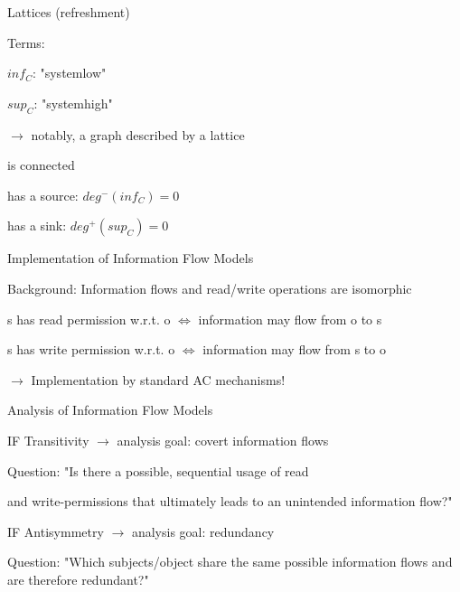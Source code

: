 \documentclass[a4paper]{article}
\begin{document}
\begin{multicols}{3}
    Lattices (refreshment)
    \begin{itemize*}
        \item Terms:
        \begin{itemize*}
            \item $inf_C$: "systemlow"
            \item $sup_C$: "systemhigh"
        \end{itemize*}
        \item $\rightarrow$ notably, a graph described by a lattice
        \item is connected
        \item has a source: $deg^-(inf_C)= 0$
        \item has a sink: $deg^+(sup_C)= 0$
    \end{itemize*}

    Implementation of Information Flow Models
    \begin{itemize*}
        \item Background: Information flows and read/write operations are isomorphic
        \begin{itemize*}
            \item s has read permission w.r.t. o $\Leftrightarrow$ information may flow from o to s
            \item s has write permission w.r.t. o $\Leftrightarrow$ information may flow from s to o
        \end{itemize*}
        \item $\rightarrow$ Implementation by standard AC mechanisms!
    \end{itemize*}

    Analysis of Information Flow Models
    \begin{itemize*}
        \item IF Transitivity $\rightarrow$ analysis goal: covert information flows
        \begin{itemize*}
            \item Question: "Is there a possible, sequential usage of read\item and write-permissions that ultimately leads to an unintended information flow?"
        \end{itemize*}
        \item IF Antisymmetry $\rightarrow$ analysis goal: redundancy
        \begin{itemize*}
            \item Question: "Which subjects/object share the same possible information flows and are therefore redundant?"
        \end{itemize*}
    \end{itemize*}


\end{multicols}
\end{document}

